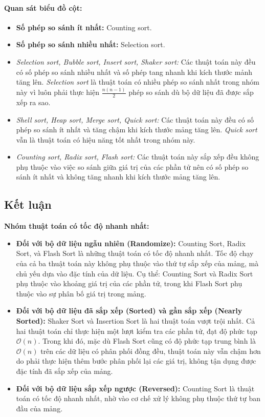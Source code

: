     \paragraph{Quan sát biểu đồ cột:}
    \begin{itemize}
        \item \textbf{Số phép so sánh ít nhất:} Counting sort.
        \item \textbf{Số phép so sánh nhiều nhất:} Selection sort.
        \item \textit{Selection sort, Bubble sort, Insert sort, Shaker sort:} Các thuật toán này đều có số phép so sánh nhiều nhất và số phép tang nhanh khi kích thước mảnh tăng lên. \textit{Selection sort} là thuật toán có nhiều phép so sánh nhất trong nhóm này vì luôn phải thực hiện $\frac{n(n-1)}{2}$ phép so sánh dù bộ dữ liệu đã được sắp xếp ra sao.
        \item \textit{Shell sort, Heap sort, Merge sort, Quick sort:} Các thuật toán này đều có số phép so sánh ít nhất và tăng chậm khi kích thước mảng tăng lên. \textit{Quick sort} vẫn là thuật toán có hiệu năng tốt nhất trong nhóm này.
        \item \textit{Counting sort, Radix sort, Flash sort:} Các thuật toán này sắp xếp đều không phụ thuộc vào việc so sánh giữa giá trị của các phần tử nên có số phép so sánh ít nhất và không tăng nhanh khi kích thước mảng tăng lên.
    \end{itemize}



\newpage
\subsection{Kết luận}

\textbf{Nhóm thuật toán có tốc độ nhanh nhất:}

\begin{itemize}
    \item \textbf{Đối với bộ dữ liệu ngẫu nhiên (Randomize):} Counting Sort, Radix Sort, và Flash Sort là những thuật toán có tốc độ nhanh nhất. Tốc độ chạy của cả ba thuật toán này không phụ thuộc vào thứ tự sắp xếp của mảng, mà chủ yếu dựa vào đặc tính của dữ liệu. Cụ thể: Counting Sort và Radix Sort phụ thuộc vào khoảng giá trị của các phần tử, trong khi Flash Sort phụ thuộc vào sự phân bố giá trị trong mảng.
    
    \item \textbf{Đối với bộ dữ liệu đã sắp xếp (Sorted) và gần sắp xếp (Nearly Sorted):} Shaker Sort và Insertion Sort là hai thuật toán vượt trội nhất. Cả hai thuật toán chỉ thực hiện một lượt kiểm tra các phần tử, đạt độ phức tạp $\mathcal{O}(n)$. Trong khi đó, mặc dù Flash Sort cũng có độ phức tạp trung bình là $\mathcal{O}(n)$ trên các dữ liệu có phân phối đồng đều, thuật toán này vẫn chậm hơn do phải thực hiện thêm bước phân phối lại các giá trị, không tận dụng được đặc tính đã sắp xếp của mảng.
    
    \item \textbf{Đối với bộ dữ liệu sắp xếp ngược (Reversed):} Counting Sort là thuật toán có tốc độ nhanh nhất, nhờ vào cơ chế xử lý không phụ thuộc thứ tự ban đầu của mảng.
\end{itemize}

